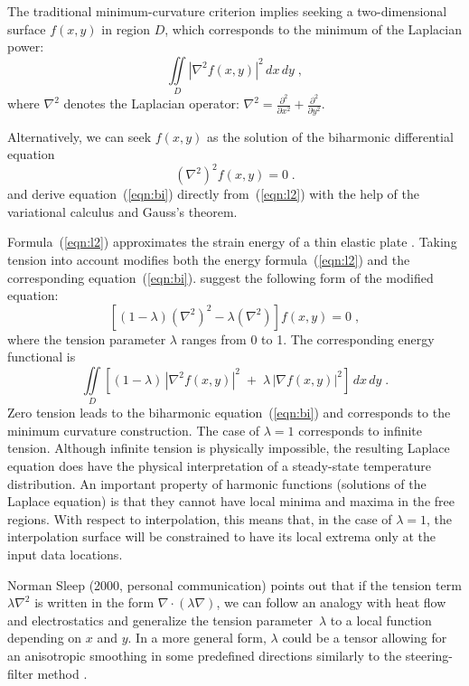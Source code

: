 The traditional minimum-curvature criterion implies seeking a
two-dimensional surface $f(x,y)$ in region $D$, which corresponds to
the minimum of the Laplacian power:
\begin{equation}
  \label{eqn:l2}
  \iint\limits_{D} \left|\nabla^2 f(x,y)\right|^2\,dx\,dy\;,
\end{equation}
where $\nabla^2$ denotes the Laplacian operator: $ \nabla^2 =
\frac{\partial^2}{\partial x^2} + \frac{\partial^2}{\partial y^2}$.
\par
Alternatively, we can seek $f(x,y)$ as the solution of the biharmonic
differential equation
\begin{equation}
  \label{eqn:bi}
  (\nabla^2)^2 f(x,y) = 0\;.
\end{equation}
 and  derive
equation~(\ref{eqn:bi}) directly from~(\ref{eqn:l2}) with the help of
the variational calculus and Gauss's theorem.
\par
Formula~(\ref{eqn:l2}) approximates the strain energy of a thin
elastic plate \cite{timoshenko}. Taking tension into account modifies
both the energy formula~(\ref{eqn:l2}) and the corresponding
equation~(\ref{eqn:bi}).  suggest the
following form of the modified equation:
\begin{equation}
  \label{eqn:bit}
  \left[(1-\lambda) (\nabla^2)^2 - \lambda (\nabla^2)\right] f(x,y) = 0\;,
\end{equation}
where the tension parameter $\lambda$ ranges from 0 to 1. The
corresponding energy functional is
\begin{equation}
  \label{eqn:l2lam}
  \iint\limits_{D} \left[(1-\lambda)\,\left|\nabla^2 f(x,y)\right|^2
\;+\;
\lambda\,\left|\nabla f(x,y)\right|^2\right]\,dx\,dy\;.
\end{equation}
Zero tension leads to the biharmonic equation~(\ref{eqn:bi}) and
corresponds to the minimum curvature construction. The case of
$\lambda=1$ corresponds to infinite tension. Although infinite tension
is physically impossible, the resulting Laplace equation does have the
physical interpretation of a steady-state temperature distribution. An
important property of harmonic functions (solutions of the Laplace
equation) is that they cannot have local minima and maxima in the free
regions. With respect to interpolation, this means that, in the case
of $\lambda=1$, the interpolation surface will be constrained to have
its local extrema only at the input data locations.

Norman Sleep (2000, personal communication) points out that if the
tension term $\lambda \nabla^2$ is written in the form $\nabla \cdot
(\lambda \nabla)$, we can follow an analogy with heat flow and
electrostatics and generalize the tension parameter~$\lambda$ to a
local function depending on $x$ and $y$. In a more general form,
$\lambda$ could be a tensor allowing for an anisotropic smoothing in
some predefined directions similarly to the steering-filter method
\cite{SEG-1998-1851}.

